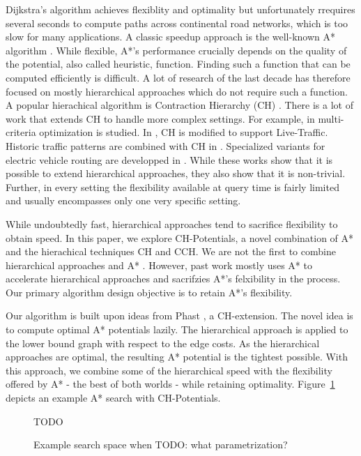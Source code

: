 \documentclass[a4paper,UKenglish,cleveref, autoref]{lipics-v2019}
\begin{document}
Dijkstra's algorithm \cite{?} achieves flexiblity and optimality but unfortunately rrequires several seconds to compute paths across continental road networks, which is too slow for many applications.
A classic speedup approach is the well-known A* algorithm \cite{hnr-afbhd-68}.
While flexible, A*'s performance crucially depends on the quality of the potential, also called heuristic, function.
Finding such a function that can be computed efficiently is difficult.
A lot of research of the last decade has therefore focused on mostly hierarchical approaches \cite{CH,CCH,CRP,HIGHWAYHIERACHIES,MLD} which do not require such a function.
A popular hierachical algorithm is Contraction Hierarchy (CH) \cite{geisberger}.
There is a lot of work that extends CH to handle more complex settings.
For example, in \cite{sabine, kobitzsch} multi-criteria optimization is studied.
In \cite{CCH}, CH is modified to support Live-Traffic.
Historic traffic patterns are combined with CH in \cite{TD-CCH-preprint, TDCH, TDCRP}.
Specialized variants for electric vehicle routing are developped in \cite{moritz baum, charge}.
While these works show that it is possible to extend hierarchical approaches, they also show that it is non-trivial.
Further, in every setting the flexibility available at query time is fairly limited and usually encompasses only one very specific setting.

While undoubtedly fast, hierarchical approaches tend to sacrifice flexibility to obtain speed.
In this paper, we explore CH-Potentials, a novel combination of A* and the hierachical techniques CH and CCH.
We are not the first to combine hierarchical approaches and A* \cite{core-alt, real, charge, bdsssw-chgds-08}.
However, past work mostly uses A* to accelerate hierarchical approaches and sacrifzies A*'s felxibility in the process.
Our primary algorithm design objective is to retain A*'s flexibility.

Our algorithm is built upon ideas from Phast \cite{?}, a CH-extension.
The novel idea is to compute optimal A* potentials lazily.
The hierarchical approach is applied to the lower bound graph with respect to the edge costs.
As the hierarchical approaches are optimal, the resulting A* potential is the tightest possible.
With this approach, we combine some of the hierarchical speed with the flexibility offered by A* - the best of both worlds - while retaining optimality.
Figure~\ref{img:search-space} depicts an example  A* search with CH-Potentials.

\begin{figure}
TODO

\caption{Example search space when TODO: what parametrization?}
\label{img:search-space}
\end{figure}
\end{document}
